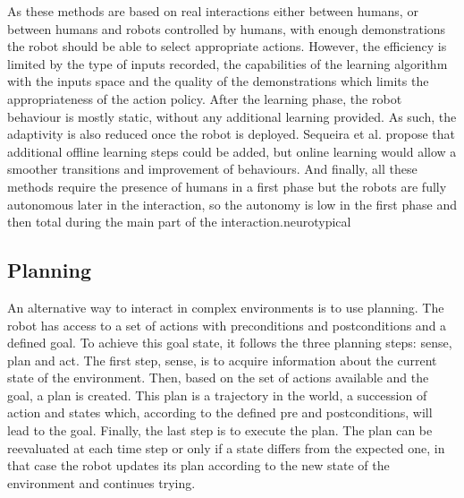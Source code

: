     As these methods are based on real interactions either between humans, or between humans and robots controlled by humans, with enough demonstrations the robot should be able to select appropriate actions. However, the efficiency is limited by the type of inputs recorded, the capabilities of the learning algorithm with the inputs space and the quality of the demonstrations which limits the appropriateness of the action policy. After the learning phase, the robot behaviour is  mostly static, without any additional learning provided. As such, the adaptivity is also reduced once the robot is deployed. Sequeira et al. propose that additional offline learning steps could be added, but online learning would allow a smoother transitions and improvement of behaviours.
    And finally, all these methods require the presence of humans in a first phase but the robots are fully autonomous later in the interaction, so the autonomy is low in the first phase and then total during the main part of the interaction.neurotypical
    
\subsection{Planning} \label{ssec:planning}
    
    An alternative way to interact in complex environments is to use planning. The robot has access to a set of actions with preconditions and postconditions and a defined goal. To achieve this goal state, it follows the three planning steps: sense, plan and act. The first step, sense, is to acquire information about the current state of the environment. Then, based on the set of actions available and the goal, a plan is created. This plan is a trajectory in the world, a succession of action and states which, according to the defined pre and postconditions, will lead to the goal. Finally, the last step is to execute the plan. The plan can be reevaluated at each time step or only if a state differs from the expected one, in that case the robot updates its plan according to the new state of the environment and continues trying.
    
